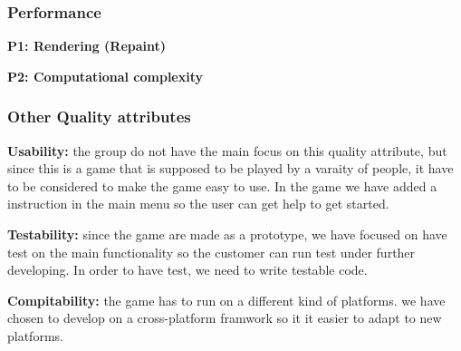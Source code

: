 \subsubsection{Performance}

{\bf P1: Rendering (Repaint)}

{\bf P2: Computational complexity}


\subsubsection{Other Quality attributes}
{\bf Usability: } the group do not have the main focus on this quality attribute, 
but since this is a game that is supposed to be played by a varaity of people, it
have to be considered to make the game easy to use. In the game we have added a 
instruction in the main menu so the user can get help to get started.

{\bf Testability: } since the game are made as a prototype, we have focused on have
test on the main functionality so the customer can run test under further developing.
In order to have test, we need to write testable code.

{\bf Compitability: } the game has to run on a different kind of platforms. we
have chosen to develop on a cross-platform framwork so it it easier to adapt to 
new platforms.